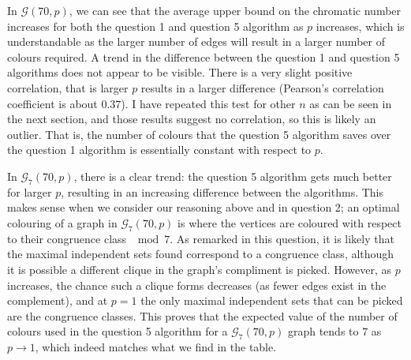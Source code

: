 \documentclass{article}
\begin{document}
In $\mathcal{G}(70,p)$, we can see that the average upper bound on the chromatic number increases for both the question 1 and question 5 algorithm as $p$ increases, which is understandable as the larger number of edges will result in a larger number of colours required. A trend in the difference between the question 1 and question 5 algorithms does not appear to be visible. There is a very slight positive correlation, that is larger $p$ results in a larger difference (Pearson's correlation coefficient is about $0.37$). I have repeated this test for other $n$ as can be seen in the next section, and those results suggest no correlation, so this is likely an outlier. That is, the number of colours that the question 5 algorithm saves over the question 1 algorithm is essentially constant with respect to $p$.

In $\mathcal{G}_7(70,p)$, there is a clear trend: the question 5 algorithm gets much better for larger $p$, resulting in an increasing difference between the algorithms. This makes sense when we consider our reasoning above and in question 2; an optimal colouring of a graph in $\mathcal{G}_7(70,p)$ is where the vertices are coloured with respect to their congruence class $\mod 7$. As remarked in this question, it is likely that the maximal independent sets found correspond to a congruence class, although it is possible a different clique in the graph's compliment is picked. However, as $p$ increases, the chance such a clique forms decreases (as fewer edges exist in the complement), and at $p=1$ the only maximal independent sets that can be picked are the congruence classes. This proves that the expected value of the number of colours used in the question 5 algorithm for a $\mathcal{G}_7(70,p)$ graph tends to $7$ as $p \to 1$, which indeed matches what we find in the table.

\begin{center}
\end{center}
\end{document}
